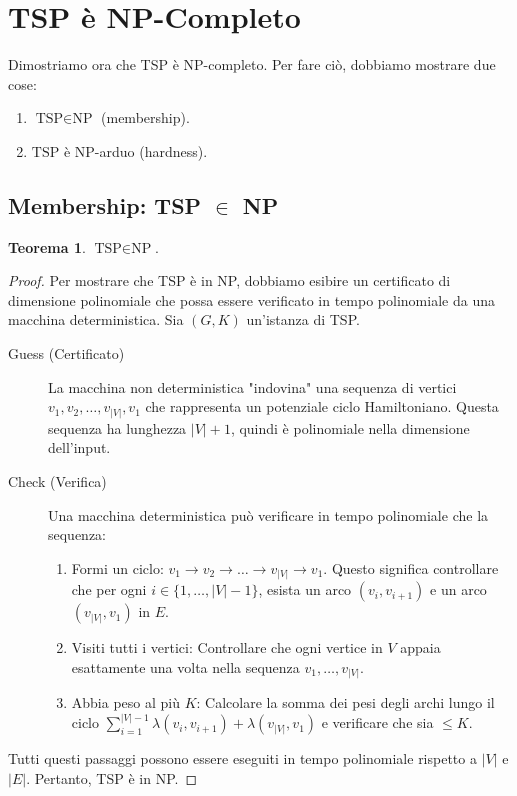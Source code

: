 \documentclass[a4paper]{article}
\theoremstyle{definition} %
\newtheorem{theorem}{Teorema}
\begin{document}
\section{TSP è NP-Completo}

Dimostriamo ora che TSP è NP-completo. Per fare ciò, dobbiamo mostrare due cose:
\begin{enumerate}
    \item $\text{TSP} \in \text{NP}$ (membership).
    \item $\text{TSP}$ è $\text{NP}$-arduo (hardness).
\end{enumerate}

\subsection{Membership: TSP $\in$ NP}

\begin{theorem}
$\text{TSP} \in \text{NP}$.
\end{theorem}
\begin{proof}
Per mostrare che TSP è in NP, dobbiamo esibire un certificato di dimensione polinomiale che possa essere verificato in tempo polinomiale da una macchina deterministica.
Sia $(G, K)$ un'istanza di TSP.
\begin{description}
    \item[Guess (Certificato)] La macchina non deterministica "indovina" una sequenza di vertici $v_1, v_2, \dots, v_{|V|}, v_1$ che rappresenta un potenziale ciclo Hamiltoniano. Questa sequenza ha lunghezza $|V|+1$, quindi è polinomiale nella dimensione dell'input.
    \item[Check (Verifica)] Una macchina deterministica può verificare in tempo polinomiale che la sequenza:
    \begin{enumerate}
        \item Formi un ciclo: $v_1 \to v_2 \to \dots \to v_{|V|} \to v_1$. Questo significa controllare che per ogni $i \in \{1, \dots, |V|-1\}$, esista un arco $(v_i, v_{i+1})$ e un arco $(v_{|V|}, v_1)$ in $E$.
        \item Visiti tutti i vertici: Controllare che ogni vertice in $V$ appaia esattamente una volta nella sequenza $v_1, \dots, v_{|V|}$.
        \item Abbia peso al più $K$: Calcolare la somma dei pesi degli archi lungo il ciclo $\sum_{i=1}^{|V|-1} \lambda(v_i, v_{i+1}) + \lambda(v_{|V|}, v_1)$ e verificare che sia $\le K$.
    \end{enumerate}
\end{description}
Tutti questi passaggi possono essere eseguiti in tempo polinomiale rispetto a $|V|$ e $|E|$.
Pertanto, TSP è in NP.
\end{proof}
\end{document}
